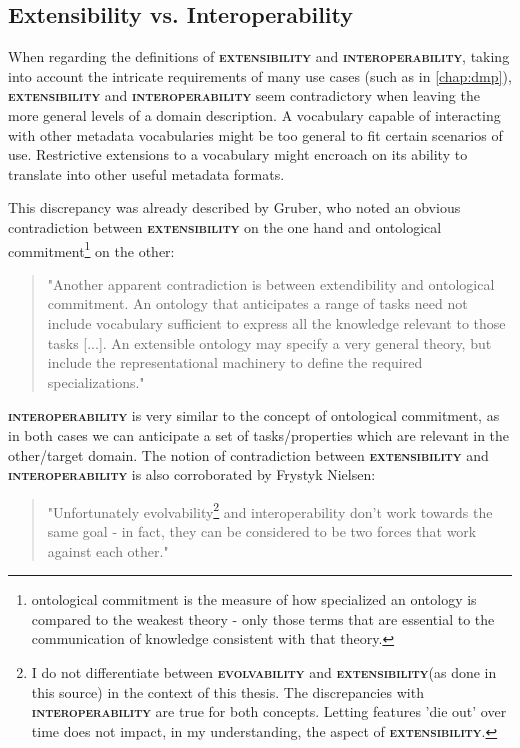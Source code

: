 \documentclass[a4paper,english,twoside,BCOR1.5cm,headsepline,DIV12,appendixprefix,final,12pt]{scrbook}
\newcommand{\extensibility}{{\ttfamily\scshape\bfseries extensibility}\xspace}
\newcommand{\interoperability}{{\ttfamily\scshape\bfseries interoperability}\xspace}
\newcommand{\evolvability}{{\ttfamily\scshape\bfseries evolvability}\xspace}
\begin{document}
\subsection{Extensibility vs. Interoperability}
\label{sec:extensvsinter}
When regarding the definitions of \extensibility and \interoperability, taking into account the intricate requirements of many use cases (such as in \cref{chap:dmp}), \extensibility and \interoperability seem contradictory when leaving the more general levels of a domain description. A vocabulary capable of interacting with other metadata vocabularies might be too general to fit certain scenarios of use. Restrictive extensions to a vocabulary might encroach on its ability to translate into other useful metadata formats. 

This discrepancy was already described by Gruber, who noted an obvious contradiction between \extensibility on the one hand and ontological commitment\footnote{ontological commitment is the measure of how specialized an ontology is compared to the weakest theory  - only those terms that are essential to the communication of knowledge consistent with that theory.} on the other:

\begin{quote}
"Another apparent contradiction is between extendibility and ontological
commitment. An ontology that anticipates a range of tasks need not include vocabulary
sufficient to express all the knowledge relevant to those tasks [...]. An extensible ontology may specify a very general theory, but include the representational machinery to define the required specializations." \cite{Gruber}
\end{quote}

\interoperability is very similar to the concept of ontological commitment, as in both cases we can anticipate a set of tasks/properties which are relevant in the other/target domain. The notion of contradiction between \extensibility and \interoperability is also corroborated by Frystyk Nielsen:

\begin{quote}
"Unfortunately evolvability\footnote{I do not differentiate between \evolvability and \extensibility (as done in this source) in the context of this thesis. The discrepancies with \interoperability are true for both concepts. Letting features 'die out' over time does not impact, in my understanding, the aspect of \extensibility.} and interoperability don't work towards the same goal - in fact, they can be considered to be two forces that work against each other." \cite{ivse}
\end{quote}
\end{document}
